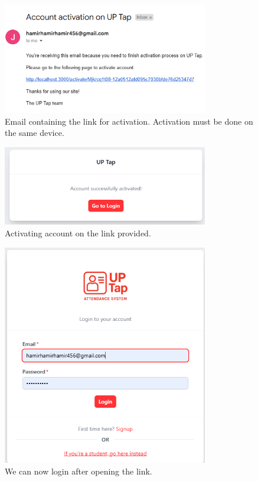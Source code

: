 \begin{figure}[h] %
	\centering
	\includegraphics[width=0.8\textwidth]{figures/chapter4/faculty_signup_email.png} %
	\caption{Email containing the link for activation. Activation must be done on the same device.}
	\label{fig:faculty_signup_email}
\end{figure}
\begin{figure}[h] %
	\centering
	\includegraphics[width=0.8\textwidth]{figures/chapter4/faculty_activation.png} %
	\caption{Activating account on the link provided.}
	\label{fig:faculty_activation}
\end{figure}
\begin{figure}[h] %
	\centering
	\includegraphics[width=0.8\textwidth]{figures/chapter4/faculty_login.png} %
	\caption{We can now login after opening the link.}
	\label{fig:faculty_login}
\end{figure}
\clearpage
